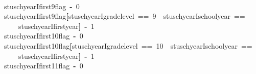 \documentclass[12pt]{article}
\makeatletter
\newcommand{\hlnumber}[1]{\textcolor[rgb]{0,0,0}{#1}}%
\newcommand{\hlkeyword}[1]{\textcolor[rgb]{0,0,0}{\textbf{#1}}}%
\newcommand{\hlassignement}[1]{\textcolor[rgb]{0,0,0}{\textbf{#1}}}%
\newcommand{\hlsymbol}[1]{\textcolor[rgb]{0,0,0}{#1}}%
\newcommand{\hlstd}[1]{\textcolor[rgb]{0,0,0}{#1}}%
\newenvironment{kframe}{%
 \def\FrameCommand##1{\hskip\@totalleftmargin \hskip-\fboxsep
 \colorbox{shadecolor}{##1}\hskip-\fboxsep
     \hskip-\linewidth \hskip-\@totalleftmargin \hskip\columnwidth}%
 \MakeFramed {\advance\hsize-\width
   \@totalleftmargin\z@ \linewidth\hsize
   \@setminipage}}%
 {\par\unskip\endMakeFramed}
\newenvironment{knitrout}{}{} %
\renewenvironment{knitrout}{\begin{footnotesize}}{\end{footnotesize}}
\makeatother
\begin{document}
\begin{knitrout}
\begin{kframe}
\begin{flushleft}
\hlstd{}\hspace*{\fill}\\
\hlstd{}\hlsymbol{stuschyearI}\hlkeyword{\usebox{\hlnormalsizeboxdollar}}\hlsymbol{first9\usebox{\hlnormalsizeboxunderscore}flag}{\ }\hlassignement{\usebox{\hlnormalsizeboxlessthan}-}{\ }\hlnumber{0}\hspace*{\fill}\\
\hlstd{}\hlsymbol{stuschyearI}\hlkeyword{\usebox{\hlnormalsizeboxdollar}}\hlsymbol{first9\usebox{\hlnormalsizeboxunderscore}flag}\hlkeyword{[}\hlsymbol{stuschyearI}\hlkeyword{\usebox{\hlnormalsizeboxdollar}}\hlsymbol{grade\usebox{\hlnormalsizeboxunderscore}level}{\ }=={\ }\hlnumber{9}{\ }\hlkeyword{\usebox{\hlnormalsizeboxand}}{\ }\hlsymbol{stuschyearI}\hlkeyword{\usebox{\hlnormalsizeboxdollar}}\hlsymbol{school\usebox{\hlnormalsizeboxunderscore}year}{\ }==\hspace*{\fill}\\
\hlstd{}{\ }{\ }{\ }{\ }\hlsymbol{stuschyearI}\hlkeyword{\usebox{\hlnormalsizeboxdollar}}\hlsymbol{first\usebox{\hlnormalsizeboxunderscore}year}\hlkeyword{]}{\ }\hlassignement{\usebox{\hlnormalsizeboxlessthan}-}{\ }\hlnumber{1}\hspace*{\fill}\\
\hlstd{}\hlsymbol{stuschyearI}\hlkeyword{\usebox{\hlnormalsizeboxdollar}}\hlsymbol{first10\usebox{\hlnormalsizeboxunderscore}flag}{\ }\hlassignement{\usebox{\hlnormalsizeboxlessthan}-}{\ }\hlnumber{0}\hspace*{\fill}\\
\hlstd{}\hlsymbol{stuschyearI}\hlkeyword{\usebox{\hlnormalsizeboxdollar}}\hlsymbol{first10\usebox{\hlnormalsizeboxunderscore}flag}\hlkeyword{[}\hlsymbol{stuschyearI}\hlkeyword{\usebox{\hlnormalsizeboxdollar}}\hlsymbol{grade\usebox{\hlnormalsizeboxunderscore}level}{\ }=={\ }\hlnumber{10}{\ }\hlkeyword{\usebox{\hlnormalsizeboxand}}{\ }\hlsymbol{stuschyearI}\hlkeyword{\usebox{\hlnormalsizeboxdollar}}\hlsymbol{school\usebox{\hlnormalsizeboxunderscore}year}{\ }==\hspace*{\fill}\\
\hlstd{}{\ }{\ }{\ }{\ }\hlsymbol{stuschyearI}\hlkeyword{\usebox{\hlnormalsizeboxdollar}}\hlsymbol{first\usebox{\hlnormalsizeboxunderscore}year}\hlkeyword{]}{\ }\hlassignement{\usebox{\hlnormalsizeboxlessthan}-}{\ }\hlnumber{1}\hspace*{\fill}\\
\hlstd{}\hlsymbol{stuschyearI}\hlkeyword{\usebox{\hlnormalsizeboxdollar}}\hlsymbol{first11\usebox{\hlnormalsizeboxunderscore}flag}{\ }\hlassignement{\usebox{\hlnormalsizeboxlessthan}-}{\ }\hlnumber{0}\hspace*{\fill}\\

\end{flushleft}
\end{kframe}
\end{knitrout}
\end{document}
